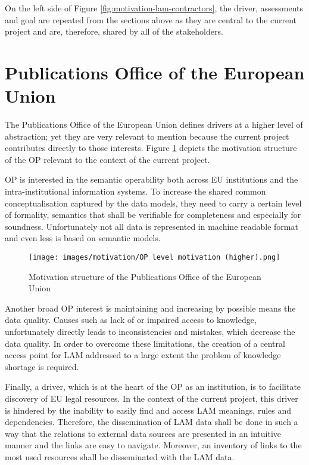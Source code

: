 	On the left side of Figure \ref{fig:motivation-lam-contractors}, the driver, assessments and goal are repeated from the sections above as they are central to the current project and are, therefore, shared by all of the stakeholders. 

	\section{Publications Office of the European Union}
	
	The Publications Office of the European Union defines drivers at a higher level of abstraction; yet they are very relevant to mention because the current project contributes directly to those interests. Figure \ref{fig:motivation-op} depicts the motivation structure of the OP relevant to the context of the current project. 
	
	OP is interested in the semantic operability both across EU institutions and the intra-institutional information systems. To increase the shared common conceptualisation captured by the data models, they need to carry a certain level of formality, semantics that shall be verifiable for completeness and especially for soundness. Unfortunately not all data is represented in machine readable format and even less is based on semantic models. 
	
	\begin{figure}[!h]
		\centering
		\texttt{[image: images/motivation/OP level motivation (higher).png]}
		\caption{Motivation structure of the Publications Office of the European Union}
		\label{fig:motivation-op}
	\end{figure}
	
	Another broad OP interest is maintaining and increasing by possible means the data quality. Causes such as lack of or impaired access to knowledge, unfortunately directly leads to inconsistencies and mistakes, which decrease the data quality. In order to overcome these limitations, the creation of a central access point for LAM addressed to a large extent the problem of knowledge shortage is required.
	
	Finally, a driver, which is at the heart of the OP as an institution, is to facilitate discovery of EU legal resources. In the context of the current project, this driver is hindered by the inability to easily find and access LAM meanings, rules and dependencies. Therefore, the dissemination of LAM data shall be done in such a way that the relations to external data sources are presented in an intuitive manner and the links are easy to navigate. Moreover, an inventory of links to the most used resources shall be disseminated with the LAM data. 
	